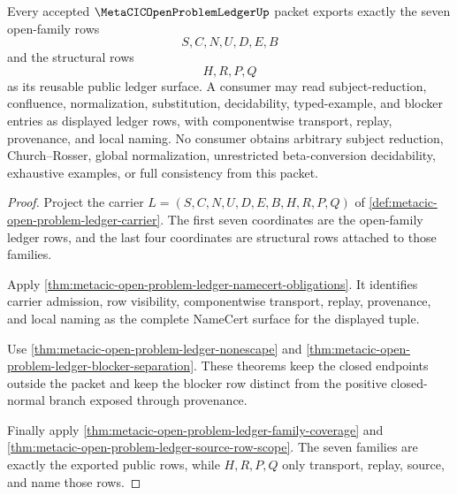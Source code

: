 \begin{theorem}
\label{thm:metacic-open-problem-ledger-export-surface}
Every accepted $\MetaCICOpenProblemLedgerUp$ packet exports exactly the seven open-family rows
$$
S,C,N,U,D,E,B
$$
and the structural rows
$$
H,R,P,Q
$$
as its reusable public ledger surface. A consumer may read subject-reduction, confluence, normalization, substitution, decidability, typed-example, and blocker entries as displayed ledger rows, with componentwise transport, replay, provenance, and local naming. No consumer obtains arbitrary subject reduction, Church--Rosser, global normalization, unrestricted beta-conversion decidability, exhaustive examples, or full consistency from this packet.
\end{theorem}
\begin{proof}
Project the carrier $L=(S,C,N,U,D,E,B,H,R,P,Q)$ of \autoref{def:metacic-open-problem-ledger-carrier}. The first seven coordinates are the open-family ledger rows, and the last four coordinates are structural rows attached to those families.

Apply \autoref{thm:metacic-open-problem-ledger-namecert-obligations}. It identifies carrier admission, row visibility, componentwise transport, replay, provenance, and local naming as the complete NameCert surface for the displayed tuple.

Use \autoref{thm:metacic-open-problem-ledger-nonescape} and \autoref{thm:metacic-open-problem-ledger-blocker-separation}. These theorems keep the closed endpoints outside the packet and keep the blocker row distinct from the positive closed-normal branch exposed through provenance.

Finally apply \autoref{thm:metacic-open-problem-ledger-family-coverage} and \autoref{thm:metacic-open-problem-ledger-source-row-scope}. The seven families are exactly the exported public rows, while $H,R,P,Q$ only transport, replay, source, and name those rows.
\end{proof}


